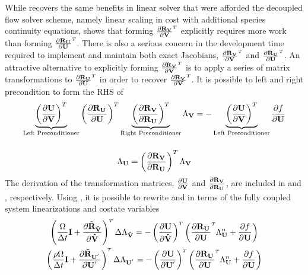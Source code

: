 While 
recovers the same benefits in linear solver that were afforded the decoupled
flow solver scheme, namely linear scaling in cost with additional species
continuity equations,  shows that forming
$\drvdv$ explicitly requires more work than forming
$\drudu$.  There is also a serious concern in the development time
required to implement and maintain both exact Jacobians, $\drvdv$ and $\drudu$.
An attractive alternative to explicitly forming $\drvdv$ is to apply a series of
matrix transformations to $\drudu$ in order to recover $\drvdv$.  It is possible
to left and right precondition  to form the RHS of
\begin{gather}
  \underbrace{
    \left( \frac{\partial \mathbf U}{\partial \mathbf V} \right)^{T}
  }_\text{Left Preconditioner}
  \left( \frac{\partial \mathbf R_{{\mathbf U}_{}}}{\partial \mathbf U} \right)^{T}
  \underbrace{
    \left( \frac{\partial \mathbf R_{{\mathbf V}_{}}}{\partial \mathbf R_{{\mathbf U}_{}}} \right)^{T}
  }_\text{Right Preconditioner}
  \Lambda_{\mathbf V}
  = 
  -
  \underbrace{
    \left( \frac{\partial \mathbf U}{\partial \mathbf V} \right)^{T}
  }_\text{Left Preconditioner}
  \frac{\partial f}{\partial \mathbf U} 
  \label{fc-to-dc-adj} \\[12pt]
  \Lambda_{\mathbf U} = \left( \frac{\partial \mathbf R_{{\mathbf V}_{}}}{\partial \mathbf R_{{\mathbf U}_{}}} \right)^{T} \Lambda_{\mathbf V}
  \label{right-precond}
\end{gather}
The derivation of the transformation matrices, $\frac{\partial \mathbf U}{\partial \mathbf V}$ and
$\frac{\partial \mathbf R_{{\mathbf V}_{}}}{\partial \mathbf R_{{\mathbf U}_{}}}$, are included in  and
, respectively.  Using
, it is possible to rewrite
 and  in terms of the fully
coupled system linearizations and costate variables
\begin{gather}
  \left(
  \frac{\vol}{\Delta t} \mi + \pd{\mathbf{\tilde{R}_{\Vhat}}}{\Vhat}
  \right)^{\mathsmaller T} \Delta \adjlam{\Vhat}
  =
  - \left( \pd{\mU}{\Vhat} \right)^{\mathsmaller T}
  \left(\pd{\ru{}}{\mU}^{\mathsmaller T}\adjlam{\mU}^n + \pd{f}{\mU} \right)
  \label{dc-fc-species-adj-time} \\
  \left(
  \frac{\rho \vol}{\Delta t} \mi + \pd{\mathbf{\tilde{R}_{\Up}}}{\Up}
  \right)^{\mathsmaller T} \Delta \adjlam{\Up}
  =
  - \left( \pd{\mU}{\Up} \right)^{\mathsmaller T}
  \left(\pd{\ru{}}{\mU}^{\mathsmaller T}\adjlam{\mU}^n + \pd{f}{\mU} \right)
  \label{dc-fc-mixture-adj-time}
\end{gather}
